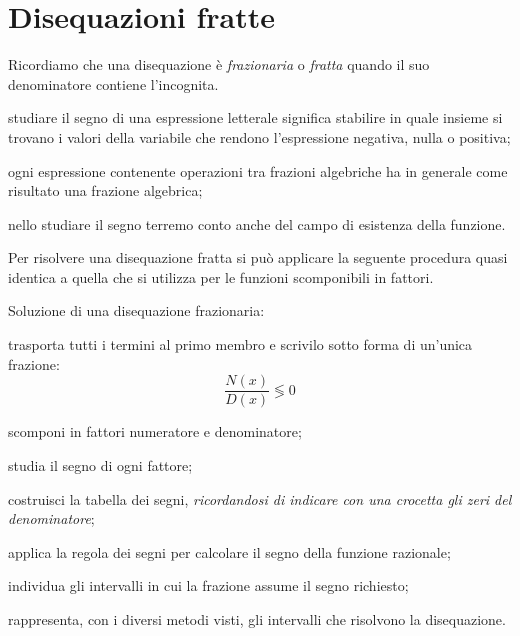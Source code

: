 
\section{Disequazioni fratte}
\label{sec:diseq_fratte}

Ricordiamo che una disequazione è \emph{frazionaria} o \emph{fratta} quando 
il suo denominatore contiene l'incognita. 

\begin{osservazione}
 \begin{itemize*}
\item studiare il segno di una espressione letterale significa stabilire in 
quale insieme si trovano i valori della variabile che rendono 
l'espressione negativa, nulla o positiva;
\item ogni espressione contenente operazioni tra frazioni algebriche ha in 
generale come risultato una frazione algebrica;
\item nello studiare il segno terremo conto anche del campo di esistenza 
della funzione.
\end{itemize*}
\end{osservazione}

Per risolvere una disequazione fratta si può applicare la seguente procedura 
quasi identica a quella che si utilizza per le funzioni scomponibili in 
fattori.

\begin{procedura}
Soluzione di una disequazione frazionaria:
\begin{enumeratea}
\item trasporta tutti i termini al primo membro e scrivilo sotto forma di 
 un'unica frazione:\\
\[\frac{N(x)}{D(x)} \lessgtr 0\]
\item scomponi in fattori numeratore e denominatore;
\item studia il segno di ogni fattore;
\item costruisci la tabella dei segni, 
\emph{ricordandosi di indicare con una crocetta gli zeri del denominatore};
\item applica la regola dei segni per calcolare il segno della funzione 
razionale;
\item individua gli intervalli in cui la frazione assume il segno richiesto;
\item rappresenta, con i diversi metodi visti, gli intervalli che 
 risolvono la disequazione.
\end{enumeratea}
\end{procedura}


